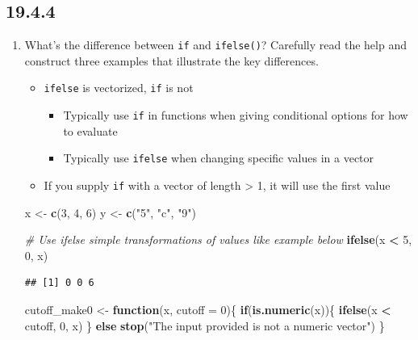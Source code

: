 \documentclass[]{book}
\newenvironment{Shaded}{\begin{snugshade}}{\end{snugshade}}
\newcommand{\CommentTok}[1]{\textcolor[rgb]{0.56,0.35,0.01}{\textit{#1}}}
\newcommand{\ControlFlowTok}[1]{\textcolor[rgb]{0.13,0.29,0.53}{\textbf{#1}}}
\newcommand{\DataTypeTok}[1]{\textcolor[rgb]{0.13,0.29,0.53}{#1}}
\newcommand{\DecValTok}[1]{\textcolor[rgb]{0.00,0.00,0.81}{#1}}
\newcommand{\KeywordTok}[1]{\textcolor[rgb]{0.13,0.29,0.53}{\textbf{#1}}}
\newcommand{\NormalTok}[1]{#1}
\newcommand{\OperatorTok}[1]{\textcolor[rgb]{0.81,0.36,0.00}{\textbf{#1}}}
\newcommand{\StringTok}[1]{\textcolor[rgb]{0.31,0.60,0.02}{#1}}
\providecommand{\tightlist}{%
  \setlength{\itemsep}{0pt}\setlength{\parskip}{0pt}}
\theoremstyle{definition}
\theoremstyle{definition}
\theoremstyle{definition}
\theoremstyle{remark}
\begin{document}
\hypertarget{section-64}{%
\subsection{19.4.4}\label{section-64}}

\begin{enumerate}
\def\labelenumi{\arabic{enumi}.}
\item
  What's the difference between \texttt{if} and \texttt{ifelse()}?
  Carefully read the help and construct three examples that illustrate
  the key differences.

  \begin{itemize}
  \tightlist
  \item
    \texttt{ifelse} is vectorized, \texttt{if} is not

    \begin{itemize}
    \tightlist
    \item
      Typically use \texttt{if} in functions when giving conditional
      options for how to evaluate
    \item
      Typically use \texttt{ifelse} when changing specific values in a
      vector
    \end{itemize}
  \item
    If you supply \texttt{if} with a vector of length \textgreater{} 1,
    it will use the first value
  \end{itemize}

\begin{Shaded}
\begin{Highlighting}[]
\NormalTok{x <-}\StringTok{ }\KeywordTok{c}\NormalTok{(}\DecValTok{3}\NormalTok{, }\DecValTok{4}\NormalTok{, }\DecValTok{6}\NormalTok{)}
\NormalTok{y <-}\StringTok{ }\KeywordTok{c}\NormalTok{(}\StringTok{"5"}\NormalTok{, }\StringTok{"c"}\NormalTok{, }\StringTok{"9"}\NormalTok{)}

\CommentTok{# Use ifelse simple transformations of values like example below}
\KeywordTok{ifelse}\NormalTok{(x }\OperatorTok{<}\StringTok{ }\DecValTok{5}\NormalTok{, }\DecValTok{0}\NormalTok{, x)}
\end{Highlighting}
\end{Shaded}

\begin{verbatim}
## [1] 0 0 6
\end{verbatim}

\begin{Shaded}
\begin{Highlighting}[]
\NormalTok{cutoff_make0 <-}\StringTok{ }\ControlFlowTok{function}\NormalTok{(x, }\DataTypeTok{cutoff =} \DecValTok{0}\NormalTok{)\{}
  \ControlFlowTok{if}\NormalTok{(}\KeywordTok{is.numeric}\NormalTok{(x))\{}
    \KeywordTok{ifelse}\NormalTok{(x }\OperatorTok{<}\StringTok{ }\NormalTok{cutoff, }\DecValTok{0}\NormalTok{, x)}
\NormalTok{  \} }\ControlFlowTok{else} \KeywordTok{stop}\NormalTok{(}\StringTok{"The input provided is not a numeric vector"}\NormalTok{)}
\NormalTok{\}}


\end{Highlighting}
\end{Shaded}
\end{enumerate}
\end{document}
